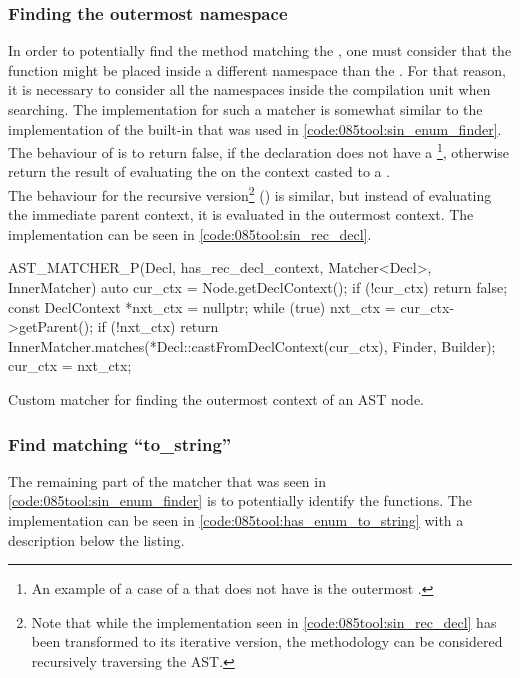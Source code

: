 \subsubsection*{Finding the outermost namespace}
In order to potentially find the  method matching the , one must consider that the function might be placed inside a different namespace than the .
For that reason, it is necessary to consider all the namespaces inside the compilation unit when searching.
The implementation for such a matcher is somewhat similar to the implementation of the built-in  that was used in \cref{code:085tool:sin_enum_finder}. 
The behaviour of  is to return false, if the declaration does not have a \footnote{
    An example of a case of a  that does not have  is the outermost .
}, otherwise return the result of evaluating the  on the context casted to a .\\
The behaviour for the recursive version\footnote{Note that while the implementation seen in \cref{code:085tool:sin_rec_decl} has been transformed to its iterative version, the methodology can be considered recursively traversing the AST.} 
() is similar, but instead of evaluating the immediate parent context, it is evaluated in the outermost context. The implementation can be seen in \cref{code:085tool:sin_rec_decl}.

\begin{listing}[H]
    \begin{cppcode}
AST_MATCHER_P(Decl, has_rec_decl_context, Matcher<Decl>, InnerMatcher) {
	auto cur_ctx = Node.getDeclContext();
	if (!cur_ctx) {
		return false;
	}
	const DeclContext *nxt_ctx = nullptr;
	while (true) {
		nxt_ctx = cur_ctx->getParent();
		if (!nxt_ctx) {
			return InnerMatcher.matches(*Decl::castFromDeclContext(cur_ctx), Finder, Builder);
		}
		cur_ctx = nxt_ctx;
	}
}
    \end{cppcode}
    \caption{Custom matcher for finding the outermost context of an AST node.}
    \label{code:085tool:sin_rec_decl}
\end{listing}

\subsubsection*{Find matching ``to\_string''}
The remaining part of the  matcher that was seen in \cref{code:085tool:sin_enum_finder} is to potentially identify the  functions. The implementation can be seen in \cref{code:085tool:has_enum_to_string} with a description below the listing.

